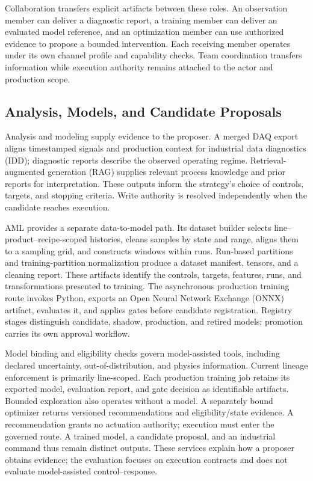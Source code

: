 Collaboration transfers explicit artifacts between these roles. An
observation member can deliver a diagnostic report, a training member can
deliver an evaluated model reference, and an optimization member can use
authorized evidence to propose a bounded intervention. Each receiving
member operates under its own channel profile and capability checks. Team
coordination transfers information while execution authority remains
attached to the actor and production scope.

\subsection{Analysis, Models, and Candidate Proposals}
Analysis and modeling supply evidence to the proposer. A merged DAQ export
aligns timestamped signals and production context for industrial data
diagnostics (IDD); diagnostic reports describe the observed operating
regime. Retrieval-augmented generation (RAG) supplies relevant process
knowledge and prior reports for interpretation. These outputs inform the
strategy's choice of controls, targets, and stopping criteria. Write
authority is resolved independently when the candidate reaches execution.

AML provides a separate data-to-model path. Its dataset builder selects
line--product--recipe-scoped histories, cleans samples by state and range,
aligns them to a sampling grid, and constructs windows within runs.
Run-based partitions and training-partition normalization produce a
dataset manifest, tensors, and a cleaning report. These artifacts identify
the controls, targets, features, runs, and transformations presented to
training. The asynchronous production training route invokes Python,
exports an Open Neural Network Exchange (ONNX) artifact, evaluates it, and
applies gates before candidate registration. Registry stages distinguish
candidate, shadow, production, and retired models; promotion carries its
own approval workflow.

Model binding and eligibility checks govern model-assisted tools, including
declared uncertainty, out-of-distribution, and physics information. Current
lineage enforcement is primarily line-scoped. Each production training job
retains its exported model, evaluation report, and gate decision as
identifiable artifacts. Bounded exploration also operates without a model.
A separately bound optimizer returns versioned recommendations and
eligibility/state evidence. A recommendation grants no actuation authority;
execution must enter the governed route.
A trained model, a candidate proposal, and an industrial command thus remain
distinct outputs. These services explain how a proposer obtains evidence;
the evaluation focuses on execution contracts and does not evaluate
model-assisted control--response.

